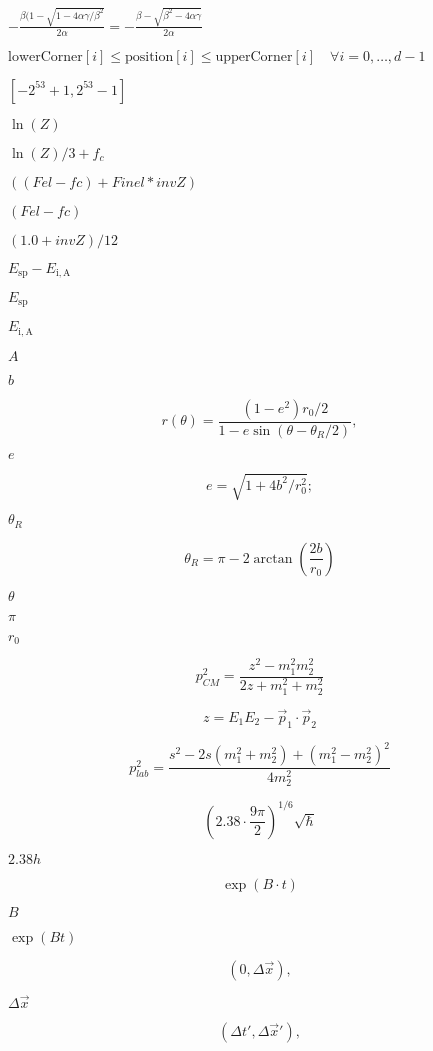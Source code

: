 \documentclass{article}
\begin{document}
$ -\frac{\beta(1-\sqrt{1-4\alpha\gamma/\beta^{2}}}{2\alpha} = - \frac{\beta - \sqrt{\beta^{2}-4\alpha\gamma}}{2\alpha} $
\pagebreak

$\text{lowerCorner}[i] \le \text{position}[i] \le \text{upperCorner}[i] \quad \forall i=0, \dots, d-1$
\pagebreak

$[-2^{53}+1, 2^{53}-1]$
\pagebreak

$ \ln(Z) $
\pagebreak

$ \ln(Z)/3 + f_c $
\pagebreak

$ ((Fel-fc)+Finel*invZ)$
\pagebreak

$ (Fel-fc)$
\pagebreak

$ (1.0+invZ)/12 $
\pagebreak

$E_\mathrm{sp}-E_\mathrm{i,A}$
\pagebreak

$E_\mathrm{sp}$
\pagebreak

$E_\mathrm{i,A}$
\pagebreak

$A$
\pagebreak

$b$
\pagebreak

\[ r(\theta) = \frac{(1-e^2)r_0/2}{1-e \sin(\theta-\theta_R/2)}, \]
\pagebreak

$e$
\pagebreak

\[ e = \sqrt{1+4b^2/r_0^2}; \]
\pagebreak

$\theta_R$
\pagebreak

\[ \theta_R = \pi - 2\arctan\left(\frac{2b}{r_0}\right) \]
\pagebreak

$\theta$
\pagebreak

$\pi$
\pagebreak

$r_0$
\pagebreak

\[ p_{CM}^2 = \frac{z^2 - m_1^2 m_2^2}{2 z + m_1^2 + m_2^2} \]
\pagebreak

\[ z = E_1 E_2 - \vec{p}_1\cdot\vec{p}_2 \]
\pagebreak

\[ p_{lab}^2 = \frac{s^2 - 2 s (m_1^2 + m_2^2) + {(m_1^2 - m_2^2)}^2}{4 m_2^2} \]
\pagebreak

\[ {\left(2.38\cdot\frac{9\pi}{2}\right)}^{1/6}\sqrt\hbar \]
\pagebreak

$2.38h$
\pagebreak

\[ \exp(B\cdot t) \]
\pagebreak

$B$
\pagebreak

$\exp(Bt)$
\pagebreak

\[ (0, \Delta\vec{x}), \]
\pagebreak

$\Delta\vec{x}$
\pagebreak

\[ (\Delta t', \Delta\vec{x}'), \]
\pagebreak
\end{document}
